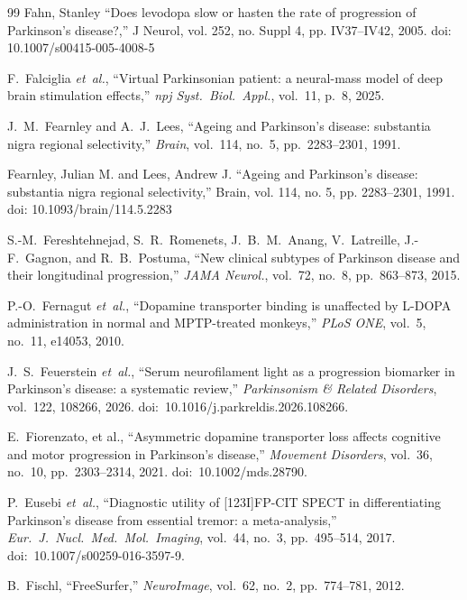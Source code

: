 \begin{thebibliography}{99}
 Fahn, Stanley ``Does levodopa slow or hasten the rate of progression of Parkinson's disease?,'' J Neurol, vol. 252, no. Suppl 4, pp. IV37--IV42, 2005. doi: 10.1007/s00415-005-4008-5

F.~Falciglia \textit{et~al.}, ``Virtual Parkinsonian patient: a neural-mass model of deep brain stimulation effects,'' \textit{npj Syst.\ Biol.\ Appl.}, vol.~11, p.~8, 2025.

J.~M.~Fearnley and A.~J.~Lees, ``Ageing and Parkinson's disease: substantia nigra regional selectivity,'' \textit{Brain}, vol.~114, no.~5, pp.~2283--2301, 1991.

 Fearnley, Julian M. and Lees, Andrew J. ``Ageing and Parkinson's disease: substantia nigra regional selectivity,'' Brain, vol. 114, no. 5, pp. 2283--2301, 1991. doi: 10.1093/brain/114.5.2283

S.-M.~Fereshtehnejad, S.~R.~Romenets, J.~B.~M.~Anang, V.~Latreille, J.-F.~Gagnon, and R.~B.~Postuma, ``New clinical subtypes of Parkinson disease and their longitudinal progression,'' \textit{JAMA Neurol.}, vol.~72, no.~8, pp.~863--873, 2015.

P.-O.~Fernagut \textit{et~al.}, ``Dopamine transporter binding is
unaffected by L-DOPA administration in normal and MPTP-treated monkeys,''
\textit{PLoS ONE}, vol.~5, no.~11, e14053, 2010.

J.~S.~Feuerstein \textit{et~al.}, ``Serum neurofilament light as a progression biomarker in Parkinson's disease: a systematic review,'' \textit{Parkinsonism \& Related Disorders}, vol.~122, 108266, 2026. doi:~10.1016/j.parkreldis.2026.108266.

E.~Fiorenzato, et al., ``Asymmetric dopamine transporter loss affects cognitive and motor progression in Parkinson's disease,'' \textit{Movement Disorders}, vol.~36, no.~10, pp.~2303--2314, 2021. doi:~10.1002/mds.28790.

P.~Eusebi \textit{et~al.}, ``Diagnostic utility of [123I]FP-CIT SPECT in differentiating Parkinson's disease from essential tremor: a meta-analysis,'' \textit{Eur.\ J.\ Nucl.\ Med.\ Mol.\ Imaging}, vol.~44, no.~3, pp.~495--514, 2017. doi:~10.1007/s00259-016-3597-9.

B.~Fischl, ``FreeSurfer,'' \textit{NeuroImage}, vol.~62, no.~2, pp.~774--781, 2012.


\end{thebibliography}
